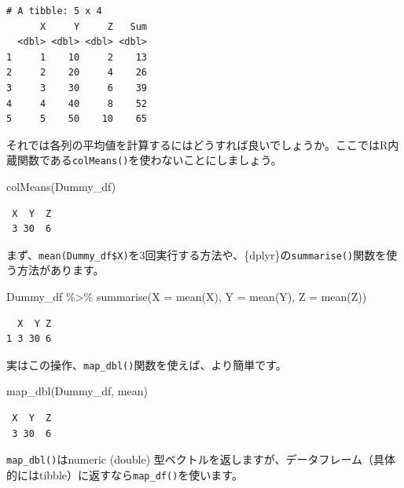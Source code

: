 \documentclass[
  a4paper,
  pandoc,
  ja=standard,
  jafont=haranoaji]{bxjsbook}
\newenvironment{Shaded}{\begin{snugshade}}{\end{snugshade}}
\newcommand{\AttributeTok}[1]{\textcolor[rgb]{0.00,0.48,0.65}{#1}}
\newcommand{\FunctionTok}[1]{\textcolor[rgb]{0.28,0.35,0.67}{#1}}
\newcommand{\NormalTok}[1]{\textcolor[rgb]{0.00,0.48,0.65}{#1}}
\newcommand{\SpecialCharTok}[1]{\textcolor[rgb]{0.37,0.37,0.37}{#1}}
\begin{document}
\begin{verbatim}
# A tibble: 5 x 4
      X     Y     Z   Sum
  <dbl> <dbl> <dbl> <dbl>
1     1    10     2    13
2     2    20     4    26
3     3    30     6    39
4     4    40     8    52
5     5    50    10    65
\end{verbatim}

それでは各列の平均値を計算するにはどうすれば良いでしょうか。ここではR内蔵関数である\texttt{colMeans()}を使わないことにしましょう。

\begin{Shaded}
\begin{Highlighting}[numbers=left,,]
\FunctionTok{colMeans}\NormalTok{(Dummy\_df)}
\end{Highlighting}
\end{Shaded}

\begin{verbatim}
 X  Y  Z 
 3 30  6 
\end{verbatim}

まず、\texttt{mean(Dummy\_df\$X)}を3回実行する方法や、\{dplyr\}の\texttt{summarise()}関数を使う方法があります。

\begin{Shaded}
\begin{Highlighting}[numbers=left,,]
\NormalTok{Dummy\_df }\SpecialCharTok{\%\textgreater{}\%}
  \FunctionTok{summarise}\NormalTok{(}\AttributeTok{X =} \FunctionTok{mean}\NormalTok{(X), }
            \AttributeTok{Y =} \FunctionTok{mean}\NormalTok{(Y),}
            \AttributeTok{Z =} \FunctionTok{mean}\NormalTok{(Z))}
\end{Highlighting}
\end{Shaded}

\begin{verbatim}
  X  Y Z
1 3 30 6
\end{verbatim}

実はこの操作、\texttt{map\_dbl()}関数を使えば、より簡単です。

\begin{Shaded}
\begin{Highlighting}[numbers=left,,]
\FunctionTok{map\_dbl}\NormalTok{(Dummy\_df, mean)}
\end{Highlighting}
\end{Shaded}

\begin{verbatim}
 X  Y  Z 
 3 30  6 
\end{verbatim}

\texttt{map\_dbl()}はnumeric (double)
型ベクトルを返しますが、データフレーム（具体的にはtibble）に返すなら\texttt{map\_df()}を使います。
\end{document}
